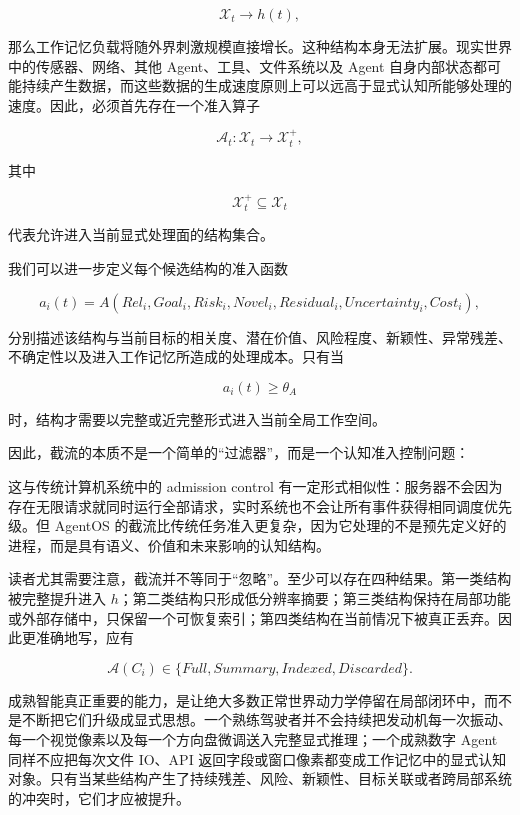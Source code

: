 \[
\mathcal X_t
\rightarrow
h(t),
\]

那么工作记忆负载将随外界刺激规模直接增长。这种结构本身无法扩展。现实世界中的传感器、网络、其他 Agent、工具、文件系统以及 Agent 自身内部状态都可能持续产生数据，而这些数据的生成速度原则上可以远高于显式认知所能够处理的速度。因此，必须首先存在一个准入算子

\[
\mathcal A_t:
\mathcal X_t
\rightarrow
\mathcal X_t^{+},
\]

其中

\[
\mathcal X_t^{+}
\subseteq
\mathcal X_t
\]

代表允许进入当前显式处理面的结构集合。

我们可以进一步定义每个候选结构的准入函数

\[
a_i(t)
=
A
\left(
Rel_i,
Goal_i,
Risk_i,
Novel_i,
Residual_i,
Uncertainty_i,
Cost_i
\right),
\]

分别描述该结构与当前目标的相关度、潜在价值、风险程度、新颖性、异常残差、不确定性以及进入工作记忆所造成的处理成本。只有当

\[
a_i(t)
\geq
\theta_A
\]

时，结构才需要以完整或近完整形式进入当前全局工作空间。

因此，截流的本质不是一个简单的“过滤器”，而是一个认知准入控制问题：

\begin{statementbox}
\centering
{}
\end{statementbox}

这与传统计算机系统中的 admission control 有一定形式相似性：服务器不会因为存在无限请求就同时运行全部请求，实时系统也不会让所有事件获得相同调度优先级。但 AgentOS 的截流比传统任务准入更复杂，因为它处理的不是预先定义好的进程，而是具有语义、价值和未来影响的认知结构。

读者尤其需要注意，截流并不等同于“忽略”。至少可以存在四种结果。第一类结构被完整提升进入 $h$；第二类结构只形成低分辨率摘要；第三类结构保持在局部功能或外部存储中，只保留一个可恢复索引；第四类结构在当前情况下被真正丢弃。因此更准确地写，应有

\[
\mathcal A(C_i)
\in
\{
Full,
Summary,
Indexed,
Discarded
\}.
\]

成熟智能真正重要的能力，是让绝大多数正常世界动力学停留在局部闭环中，而不是不断把它们升级成显式思想。一个熟练驾驶者并不会持续把发动机每一次振动、每一个视觉像素以及每一个方向盘微调送入完整显式推理；一个成熟数字 Agent 同样不应把每次文件 IO、API 返回字段或窗口像素都变成工作记忆中的显式认知对象。只有当某些结构产生了持续残差、风险、新颖性、目标关联或者跨局部系统的冲突时，它们才应被提升。

